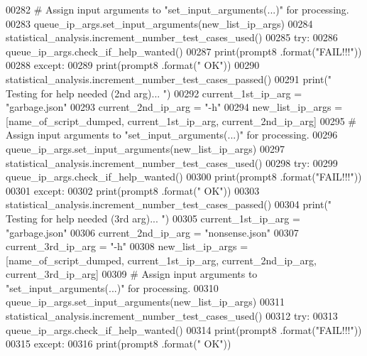 \begin{DoxyCode}
00282         \textcolor{comment}{#   Assign input arguments to "set\_input\_arguments(...)" for processing.}
00283         queue\_ip\_args.set\_input\_arguments(new\_list\_ip\_args)
00284         statistical\_analysis.increment\_number\_test\_cases\_used()
00285         \textcolor{keywordflow}{try}:
00286             queue\_ip\_args.check\_if\_help\_wanted()
00287             print(prompt8 .format(\textcolor{stringliteral}{"FAIL!!!"}))
00288         \textcolor{keywordflow}{except}:
00289             print(prompt8 .format(\textcolor{stringliteral}{" OK"}))
00290             statistical\_analysis.increment\_number\_test\_cases\_passed()
00291         print(\textcolor{stringliteral}{" Testing for help needed (2nd arg)... "})
00292         current\_1st\_ip\_arg = \textcolor{stringliteral}{"garbage.json"}
00293         current\_2nd\_ip\_arg = \textcolor{stringliteral}{"-h"}
00294         new\_list\_ip\_args = [name\_of\_script\_dumped, current\_1st\_ip\_arg, current\_2nd\_ip\_arg]
00295         \textcolor{comment}{#   Assign input arguments to "set\_input\_arguments(...)" for processing.}
00296         queue\_ip\_args.set\_input\_arguments(new\_list\_ip\_args)
00297         statistical\_analysis.increment\_number\_test\_cases\_used()
00298         \textcolor{keywordflow}{try}:
00299             queue\_ip\_args.check\_if\_help\_wanted()
00300             print(prompt8 .format(\textcolor{stringliteral}{"FAIL!!!"}))
00301         \textcolor{keywordflow}{except}:
00302             print(prompt8 .format(\textcolor{stringliteral}{" OK"}))
00303             statistical\_analysis.increment\_number\_test\_cases\_passed()
00304         print(\textcolor{stringliteral}{" Testing for help needed (3rd arg)... "})
00305         current\_1st\_ip\_arg = \textcolor{stringliteral}{"garbage.json"}
00306         current\_2nd\_ip\_arg = \textcolor{stringliteral}{"nonsense.json"}
00307         current\_3rd\_ip\_arg = \textcolor{stringliteral}{"-h"}
00308         new\_list\_ip\_args = [name\_of\_script\_dumped, current\_1st\_ip\_arg, current\_2nd\_ip\_arg, 
      current\_3rd\_ip\_arg]
00309         \textcolor{comment}{#   Assign input arguments to "set\_input\_arguments(...)" for processing.}
00310         queue\_ip\_args.set\_input\_arguments(new\_list\_ip\_args)
00311         statistical\_analysis.increment\_number\_test\_cases\_used()
00312         \textcolor{keywordflow}{try}:
00313             queue\_ip\_args.check\_if\_help\_wanted()
00314             print(prompt8 .format(\textcolor{stringliteral}{"FAIL!!!"}))
00315         \textcolor{keywordflow}{except}:
00316             print(prompt8 .format(\textcolor{stringliteral}{" OK"}))

\end{DoxyCode}
